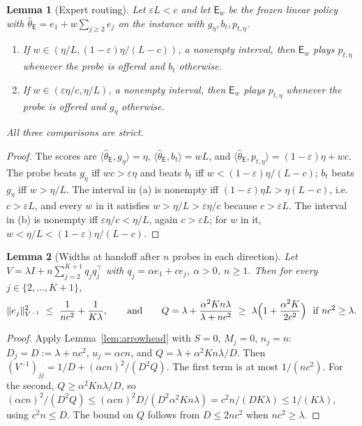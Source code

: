 \documentclass{article}
\newtheorem{lemma}{Lemma}
\theoremstyle{definition}
\theoremstyle{remark}
\newcommand{\eps}{\varepsilon}
\theoremstyle{remark}
\newcommand{\Exp}{\mathsf{E}}
\begin{document}
\begin{lemma}[Expert routing]
\label{lem:expert-routes}
Let $\eps L<c$ and let $\Exp_w$ be the frozen linear policy with
$\widehat\theta_{\Exp}=e_1+w\sum_{j\ge2}e_j$ on the instance with $g_\eta,b_t,p_{t,\eta}$.
\begin{enumerate}[itemsep=1pt,topsep=1pt,leftmargin=*]
\item[(a)] If $w\in(\eta/L,(1-\eps)\eta/(L-c))$, a nonempty interval, then
$\Exp_w$ plays $p_{t,\eta}$ whenever the probe is offered and $b_t$ otherwise.
\item[(b)] If $w\in(\eps\eta/c,\eta/L)$, a nonempty interval, then $\Exp_w$ plays
$p_{t,\eta}$ whenever the probe is offered and $g_\eta$ otherwise.
\end{enumerate}
All three comparisons are strict.
\end{lemma}

\begin{proof}
The scores are $\langle\widehat\theta_{\Exp},g_\eta\rangle=\eta$,
$\langle\widehat\theta_{\Exp},b_t\rangle=wL$, and
$\langle\widehat\theta_{\Exp},p_{t,\eta}\rangle=(1-\eps)\eta+wc$. The probe beats
$g_\eta$ iff $wc>\eps\eta$ and beats $b_t$ iff $w<(1-\eps)\eta/(L-c)$; $b_t$
beats $g_\eta$ iff $w>\eta/L$. The interval in (a) is nonempty iff
$(1-\eps)\eta L>\eta(L-c)$, i.e.\ $c>\eps L$, and every $w$ in it satisfies
$w>\eta/L>\eps\eta/c$ because $c>\eps L$. The interval in (b) is nonempty iff
$\eps\eta/c<\eta/L$, again $c>\eps L$; for $w$ in it, $w<\eta/L<(1-\eps)\eta/(L-c)$.
\end{proof}

\begin{lemma}[Widths at handoff after $n$ probes in each direction]
\label{lem:cat-handoff}
Let $V=\lambda I+n\sum_{j=2}^{K+1}q_jq_j^\top$ with $q_j=\alpha e_1+ce_j$, $\alpha>0$,
$n\ge1$. Then for every $j\in\{2,\dots,K+1\}$,
\[
\|e_j\|^2_{V^{-1}}\ \le\ \frac1{nc^2}+\frac1{K\lambda},
\qquad\text{and}\qquad
Q=\lambda+\frac{\alpha^2Kn\lambda}{\lambda+nc^2}\ \ge\ \lambda\Bigl(1+\frac{\alpha^2K}{2c^2}\Bigr)\ \text{ if } nc^2\ge\lambda .
\]
\end{lemma}

\begin{proof}
Apply Lemma~\ref{lem:arrowhead} with $S=0$, $M_j=0$, $n_j=n$: $D_j=D:=\lambda+nc^2$,
$u_j=\alpha cn$, and $Q=\lambda+\alpha^2Kn\lambda/D$. Then
$(V^{-1})_{jj}=1/D+(\alpha cn)^2/(D^2Q)$. The first term is at most $1/(nc^2)$.
For the second, $Q\ge\alpha^2Kn\lambda/D$, so
$(\alpha cn)^2/(D^2Q)\le(\alpha cn)^2D/(D^2\alpha^2Kn\lambda)=c^2n/(DK\lambda)\le1/(K\lambda)$,
using $c^2n\le D$. The bound on $Q$ follows from $D\le2nc^2$ when $nc^2\ge\lambda$.
\end{proof}
\end{document}
